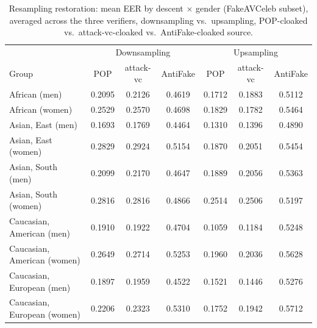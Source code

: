 \documentclass[11pt]{article}
\begin{document}
\begin{table}[H]
\centering
\caption{Resampling restoration: mean EER by descent $\times$ gender
(FakeAVCeleb subset), averaged across the three verifiers, downsampling
vs.\ upsampling, POP-cloaked vs.\ attack-vc-cloaked vs.\
AntiFake-cloaked source.}
\label{tab:restoration-resampling-demographics}
\begin{tabular}{lcccccc}
\toprule
& \multicolumn{3}{c}{Downsampling} & \multicolumn{3}{c}{Upsampling} \\
Group & POP & attack-vc & AntiFake & POP & attack-vc & AntiFake \\
\midrule
African (men)               & 0.2095 & 0.2126 & 0.4619 & 0.1712 & 0.1883 & 0.5112 \\
African (women)              & 0.2529 & 0.2570 & 0.4698 & 0.1829 & 0.1782 & 0.5464 \\
Asian, East (men)            & 0.1693 & 0.1769 & 0.4464 & 0.1310 & 0.1396 & 0.4890 \\
Asian, East (women)          & 0.2829 & 0.2924 & 0.5154 & 0.1870 & 0.2051 & 0.5454 \\
Asian, South (men)           & 0.2099 & 0.2170 & 0.4647 & 0.1889 & 0.2056 & 0.5363 \\
Asian, South (women)         & 0.2816 & 0.2816 & 0.4866 & 0.2514 & 0.2506 & 0.5197 \\
Caucasian, American (men)    & 0.1910 & 0.1922 & 0.4704 & 0.1059 & 0.1184 & 0.5248 \\
Caucasian, American (women)  & 0.2649 & 0.2714 & 0.5253 & 0.1960 & 0.2036 & 0.5628 \\
Caucasian, European (men)    & 0.1897 & 0.1959 & 0.4522 & 0.1521 & 0.1446 & 0.5276 \\
Caucasian, European (women)  & 0.2206 & 0.2323 & 0.5310 & 0.1752 & 0.1942 & 0.5712 \\
\bottomrule
\end{tabular}
\end{table}
\end{document}

